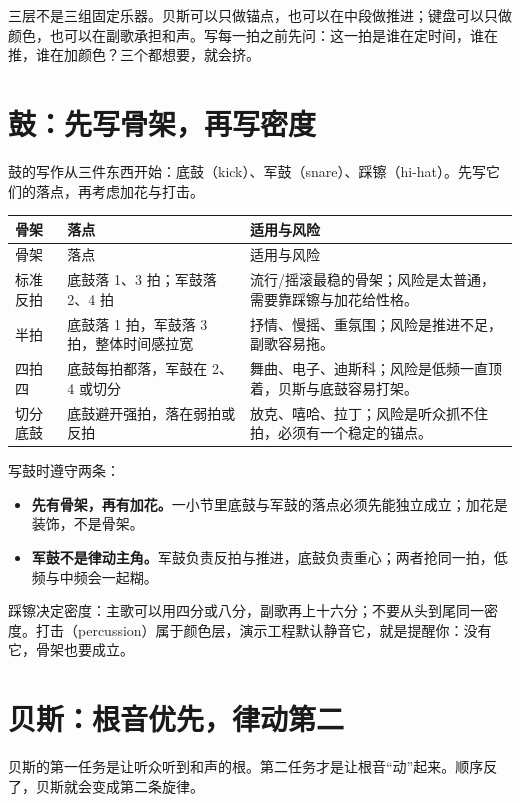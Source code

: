 三层不是三组固定乐器。贝斯可以只做锚点，也可以在中段做推进；键盘可以只做颜色，也可以在副歌承担和声。写每一拍之前先问：这一拍是谁在定时间，谁在推，谁在加颜色？三个都想要，就会挤。

\section{鼓：先写骨架，再写密度}
\label{sec:drums}

鼓的写作从三件东西开始：底鼓（kick）、军鼓（snare）、踩镲（hi-hat）。先写它们的落点，再考虑加花与打击。

\begin{longtable}{p{}p{}p{}}
\toprule
骨架 & 落点 & 适用与风险 \\
\midrule
\endfirsthead
\toprule
骨架 & 落点 & 适用与风险 \\
\midrule
\endhead
标准反拍 & 底鼓落 1、3 拍；军鼓落 2、4 拍 & 流行/摇滚最稳的骨架；风险是太普通，需要靠踩镲与加花给性格。 \\
半拍 & 底鼓落 1 拍，军鼓落 3 拍，整体时间感拉宽 & 抒情、慢摇、重氛围；风险是推进不足，副歌容易拖。 \\
四拍四 & 底鼓每拍都落，军鼓在 2、4 或切分 & 舞曲、电子、迪斯科；风险是低频一直顶着，贝斯与底鼓容易打架。 \\
切分底鼓 & 底鼓避开强拍，落在弱拍或反拍 & 放克、嘻哈、拉丁；风险是听众抓不住拍，必须有一个稳定的锚点。 \\
\bottomrule
\end{longtable}

写鼓时遵守两条：

\begin{itemize}
\item \textbf{先有骨架，再有加花。}一小节里底鼓与军鼓的落点必须先能独立成立；加花是装饰，不是骨架。
\item \textbf{军鼓不是律动主角。}军鼓负责反拍与推进，底鼓负责重心；两者抢同一拍，低频与中频会一起糊。
\end{itemize}

踩镲决定密度：主歌可以用四分或八分，副歌再上十六分；不要从头到尾同一密度。打击（percussion）属于颜色层，演示工程默认静音它，就是提醒你：没有它，骨架也要成立。

\section{贝斯：根音优先，律动第二}
\label{sec:bass}

贝斯的第一任务是让听众听到和声的根。第二任务才是让根音“动”起来。顺序反了，贝斯就会变成第二条旋律。

